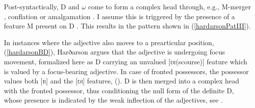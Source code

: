 \documentclass[output=paper]{langscibook}
\begin{document}
Post-syntactically, D and $\omega$ come to form a complex head through, e.g., M-merger \citep{Marantz:1988ug,Matushanski:2006ud}, conflation \citep{Harley:2004ue} or amalgamation \citep{Harizanov:2018ep}. I assume this is triggered by the presence of a feature M present on D \citep[cf.][]{Harley:2004ue,Harizanov:2018ep}. This results in the pattern shown in (\ref{hardarsonPatIII}).

\begin{exe}
\end{exe}

In instances where the adjective also moves to a prearticular position, (\ref{hardarsonBD}), Harðarson \citeyearpar[147ff]{Hardarson:2016wd} argues that the adjective is undergoing focus movement, formalized here as D carrying an unvalued [\textsc{di}(scourse)] feature which is valued by a focus-bearing adjective. In case of fronted possessors, the possessor values both [\textsc{r}] and the [\textsc{di}] features, (). D is then merged into a complex head with the fronted possessor, thus conditioning the null form of the definite D, whose presence is indicated by the weak inflection of the adjectives, see .
\end{document}
